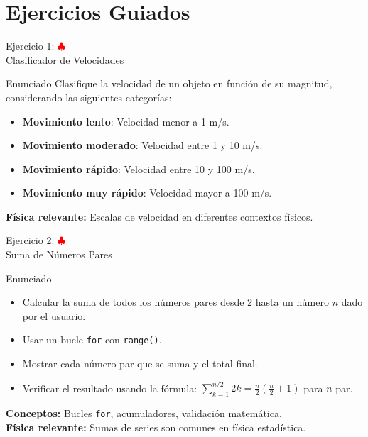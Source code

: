 \documentclass[10pt]{beamer}
\begin{document}
\section{Ejercicios Guiados}

\begin{frame}{Ejercicio 1: \hfill \textcolor{red}{$\clubsuit$} \\ Clasificador de Velocidades}
  \begin{block}{Enunciado}
    Clasifique la velocidad de un objeto en función de su magnitud, considerando las siguientes categorías:
    \begin{itemize}
      \item \textbf{Movimiento lento}: Velocidad menor a 1 m/s.
      \item \textbf{Movimiento moderado}: Velocidad entre 1 y 10 m/s.
      \item \textbf{Movimiento rápido}: Velocidad entre 10 y 100 m/s.
      \item \textbf{Movimiento muy rápido}: Velocidad mayor a 100 m/s.
    \end{itemize}
    \textbf{Física relevante:} Escalas de velocidad en diferentes contextos físicos.
  \end{block}
\end{frame}



\begin{frame}{Ejercicio 2: \hfill \textcolor{red}{$\clubsuit$} \\ Suma de Números Pares}
  \begin{block}{Enunciado}
    \begin{itemize}
      \item Calcular la suma de todos los números pares desde 2 hasta un número \(n\) dado por el usuario.
      \item Usar un bucle \texttt{for} con \texttt{range()}.
      \item Mostrar cada número par que se suma y el total final.
      \item Verificar el resultado usando la fórmula: $\sum_{k=1}^{n/2} 2k = \frac{n}{2}(\frac{n}{2} + 1)$ para \(n\) par.
    \end{itemize}
  \end{block}
  
  \textbf{Conceptos:} Bucles \texttt{for}, acumuladores, validación matemática.
  \\
  \textbf{Física relevante:} Sumas de series son comunes en física estadística.
\end{frame}
\end{document}
